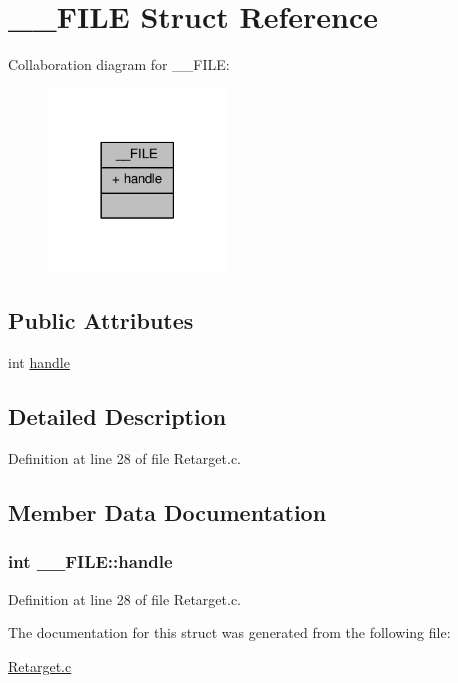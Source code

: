 \hypertarget{struct_____f_i_l_e}{\section{\-\_\-\-\_\-\-F\-I\-L\-E Struct Reference}
\label{struct_____f_i_l_e}
}


Collaboration diagram for \-\_\-\-\_\-\-F\-I\-L\-E\-:
\nopagebreak
\begin{figure}[H]
\begin{center}
\leavevmode
\includegraphics[width=134pt]{struct_____f_i_l_e__coll__graph}
\end{center}
\end{figure}
\subsection*{Public Attributes}
\begin{DoxyCompactItemize}
\item 
int \hyperlink{struct_____f_i_l_e_ac65d6afc3b2c74e74d56195829a1626f}{handle}
\end{DoxyCompactItemize}


\subsection{Detailed Description}


Definition at line 28 of file Retarget.\-c.



\subsection{Member Data Documentation}
\hypertarget{struct_____f_i_l_e_ac65d6afc3b2c74e74d56195829a1626f}{
\subsubsection[{handle}]{\setlength{\rightskip}{0pt plus 5cm}int \-\_\-\-\_\-\-F\-I\-L\-E\-::handle}}\label{struct_____f_i_l_e_ac65d6afc3b2c74e74d56195829a1626f}


Definition at line 28 of file Retarget.\-c.



The documentation for this struct was generated from the following file\-:\begin{DoxyCompactItemize}
\item 
\hyperlink{_retarget_8c}{Retarget.\-c}\end{DoxyCompactItemize}
